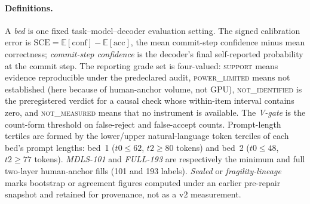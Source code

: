 \documentclass{article}
\begin{document}
\paragraph{Definitions.}
A \emph{bed} is one fixed task--model--decoder evaluation setting.  The signed
calibration error is $\mathrm{SCE}=\mathbb{E}[\mathrm{conf}]-\mathbb{E}[\mathrm{acc}]$,
the mean commit-step confidence minus mean correctness; \emph{commit-step confidence}
is the decoder's final self-reported probability at the commit step.  The reporting
grade set is four-valued: \textsc{support} means evidence reproducible under the
predeclared audit, \textsc{power\_limited} means not established (here because of
human-anchor volume, not GPU), \textsc{not\_identified} is the preregistered verdict
for a causal check whose within-item interval contains zero, and \textsc{not\_measured}
means that no instrument is available.  The \emph{V-gate} is the count-form threshold
on false-reject and false-accept counts.  Prompt-length tertiles are formed by the
lower/upper natural-language token terciles of each bed's prompt lengths: bed~1
($t0{\le}62$, $t2{\ge}80$ tokens) and bed~2 ($t0{\le}48$, $t2{\ge}77$ tokens).
\emph{MDLS-101} and \emph{FULL-193} are respectively the
minimum and full two-layer human-anchor fills (101 and 193 labels).  \emph{Sealed} or
\emph{fragility-lineage} marks bootstrap or agreement figures computed under an
earlier pre-repair snapshot and retained for provenance, not as a v2 measurement.
\end{document}
